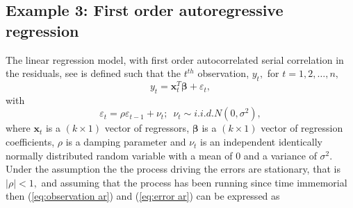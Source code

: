\documentclass[article]{jss}
\begin{document}
\subsection{Example 3: First order autoregressive regression}
\label{sub:Example-3:-First}

The linear regression model, with first order autocorrelated serial correlation
in the residuals, see \citet{Zellner1971} is defined such that the $t^{th}$ observation, $y_{t},$ for
$t=1,2,\dots,n,$\begin{equation}
  y_{t}=\bm{x}_{t}^{T}\bm{\beta}+\varepsilon_{t},\label{eq:observation
    ar}\end{equation} with\begin{equation}
  \varepsilon_{t}=\rho\varepsilon_{t-1}+\nu_{t};\,\,\,\nu_{t}\sim
  i.i.d.N(0,\sigma^{2}),\label{eq:error ar}\end{equation} where
\textbf{$\bm{x}_{t}$} is a $\left(k\times1\right)$ vector of
regressors, $\bm{\beta}$ is a $\left(k\times1\right)$ vector of
regression coefficients, $\rho$ is a damping parameter and $\nu_{t}$
is an independent identically normally distributed random variable
with a mean of 0 and a variance of $\sigma^{2}.$ Under the assumption
the the process driving the errors are stationary, that is $|\rho|<1,$
and assuming that the process has been running since time immemorial
then (\ref{eq:observation ar}) and (\ref{eq:error ar}) can be
expressed as
\end{document}
